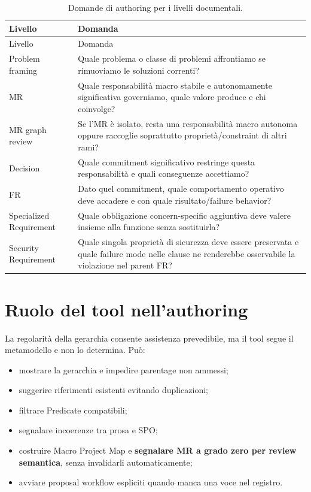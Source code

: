\documentclass[12pt,a4paper,oneside]{report}
\begin{document}
\begin{longtable}{p{}p{}}
\caption{Domande di authoring per i livelli documentali.}\label{tab:authoring-questions-final}\\
\toprule
Livello & Domanda \\
\midrule
\endfirsthead
\toprule
Livello & Domanda \\
\midrule
\endhead
Problem framing & Quale problema o classe di problemi affrontiamo se rimuoviamo le soluzioni correnti? \\
MR & Quale responsabilità macro stabile e autonomamente significativa governiamo, quale valore produce e chi coinvolge? \\
MR graph review & Se l'MR è isolato, resta una responsabilità macro autonoma oppure raccoglie soprattutto proprietà/constraint di altri rami? \\
Decision & Quale commitment significativo restringe questa responsabilità e quali conseguenze accettiamo? \\
FR & Dato quel commitment, quale comportamento operativo deve accadere e con quale risultato/failure behavior? \\
Specialized Requirement & Quale obbligazione concern-specific aggiuntiva deve valere insieme alla funzione senza sostituirla? \\
Security Requirement & Quale singola proprietà di sicurezza deve essere preservata e quale failure mode nelle clause ne renderebbe osservabile la violazione nel parent FR? \\
\bottomrule
\end{longtable}

\section{Ruolo del tool nell'authoring}

La regolarità della gerarchia consente assistenza prevedibile, ma il tool segue il metamodello e non lo determina. Può:
\begin{itemize}
  \item mostrare la gerarchia e impedire parentage non ammessi;
  \item suggerire riferimenti esistenti evitando duplicazioni;
  \item filtrare Predicate compatibili;
  \item segnalare incoerenze tra prosa e SPO;
  \item costruire Macro Project Map e \textbf{segnalare MR a grado zero per review semantica}, senza invalidarli automaticamente;
  \item avviare proposal workflow espliciti quando manca una voce nel registro.
\end{itemize}
\end{document}
